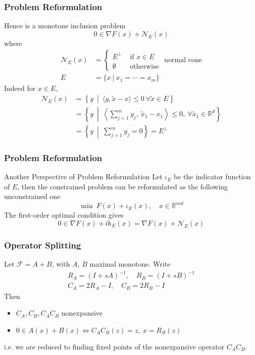 \begin{frame}
\frametitle{Problem Reformulation}

Hence is a monotone inclusion problem
$$0 \in \nabla F(x) + \mathcal{N}_E(x)$$
where
\begin{align*}
\mathcal{N}_E(x) & = \begin{cases} E^{\perp} & \text{ if } x \in E \\ \emptyset & \text{ otherwise } \end{cases} \text{normal cone} \\
E & = \{x \ |\ x_1 = \cdots = x_m\}
\end{align*}
Indeed for $x\in E$,
\begin{align*}
\mathcal{N}_E(x) & = \left\{ y \ \middle|\ \langle y, \widetilde{x} - x \rangle \leqslant 0 \ \forall \widetilde{x} \in E \right\} \\
& = \left\{ y \ \middle|\ \left\langle \sum\nolimits_{j=1}^m y_j, ~ \widetilde{x}_1 - x_1 \right\rangle \leqslant 0, \ \forall \widetilde{x}_1 \in \mathbb{R}^d \right\} \\
& = \left\{ y \ \middle|\ \sum\nolimits_{j=1}^m y_j = 0 \right\} = E^{\perp}
\end{align*}

\end{frame}


\begin{frame}
\frametitle{Problem Reformulation}

\begin{block}{Another Perspective of Problem Reformulation}
Let $\iota_E$ be the indicator function of $E$, then the constrained problem can be reformulated as the following unconstrained one
$$\min \ F(x) + \iota_E(x), \quad x \in \mathbb{R}^{md}$$
The first-order optimal condition gives
$$0 \in \nabla F(x) + \partial \iota_E(x) = \nabla F(x) + \mathcal{N}_E(x)$$
\end{block}

\end{frame}


\begin{frame}
\frametitle{Operator Splitting}

Let $\mathcal{F} = A+B$, with $A$, $B$ maximal monotone. Write
\begin{gather*}
R_A = (I + s A)^{-1}, \quad R_B = (I + s B)^{-1} \\
C_A = 2R_A - I, \quad C_B = 2R_B - I
\end{gather*}
Then
\begin{itemize}
    \item $C_A, C_B, C_AC_B$ nonexpansive
    \item $0\in A(x)+B(x) \Longleftrightarrow C_AC_B(z) = z, \ x = R_B(z)$
\end{itemize}
i.e. we are reduced to finding fixed points of the nonexpansive operator $ C_AC_B$.

\end{frame}

